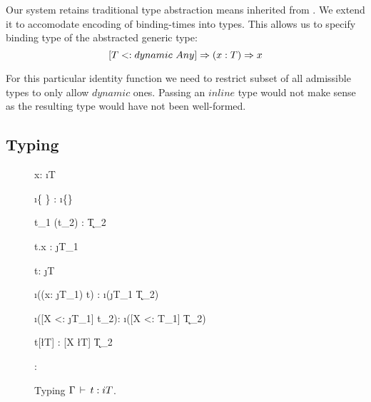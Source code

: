 Our system retains traditional type abstraction means inherited from \fsub.
We extend it to accomodate encoding of binding-times into types. This allows
us to specify binding type of the abstracted generic type:
\begin{equation}\nonumber
  [T <: dynamic\ Any] \Rightarrow (x: T) \Rightarrow x
\end{equation}

For this particular identity function we need to restrict subset of all admissible
types to only allow $dynamic$ ones. Passing an $inline$ type would not make sense
as the resulting type would have not been well-formed.

\subsection{Typing}

\begin{figure}[H]
  {\Gamma \ts x: \i{T}}

  {\Gamma \ts \i{\{  \}} : \i{\{\}}}

  {\Gamma \ts t_1 (t_2) : \k{T_2}}

  {\Gamma \ts t.x : \j{T_1}}

  {\Gamma \ts t: \j{T}}

  {\Gamma \ts \i{((x: \j{T_1}) \ra t)} : \i{(\j{T_1} \ra \k{T_2})}}

  {\Gamma \ts \i([X <: \j{T_1}] \ra t_2): \i{([X <: T_1] \ra \k{T_2})}}

  {\Gamma \ts t[\l{T}] : [X \mapsto \l{T}] \k{T_2}}

  {\Gamma \ts {} : }
\caption{Typing $\Gamma \,\vdash\, t: i T$.}
\end{figure}

